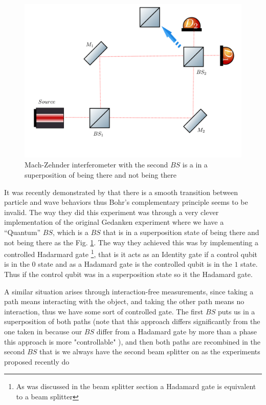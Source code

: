 \documentclass{book}
\begin{document}
\begin{figure}[H]
\centering
\includegraphics[width=\linewidth,height=7.5 cm]{images/wheeler3.png}
\caption{Mach-Zehnder interferometer with the second $BS$ is a in a superposition of being there and not being there}
\label{wheeler3}
\end{figure}

It was recently demonstrated by \cite{Peruzzo, Kaiser2012} that there is a smooth transition between particle and wave behaviors thus Bohr's complementary principle seems to be invalid. The way they did this experiment was through a very clever implementation of the original Gedanken experiment where we have a ``Quantum'' $BS$, which is a $BS$ that is in a superposition state of being there and not being there as the Fig. \ref{wheeler3}. The way they achieved this was by implementing a controlled Hadarmard gate \footnote{As was discussed in the beam splitter section a Hadamard gate is equivalent to a beam splitter}, that is it acts as an Identity gate if a control qubit is in the $0$ state and as a Hadamard gate is the controlled qubit is in the $1$ state. Thus if the control qubit was in a superposition state so it the Hadamard gate.




A similar situation arises through interaction-free measurements, since taking a path means interacting with the object, and taking the other path means no interaction, thus we have some sort of controlled gate. The first $BS$ puts us in a superposition of both paths (note that this approach differs significantly from the one taken in \cite{Peruzzo,Kaiser2012} because our $BS$ differ from a Hadamard gate by more than a phase this approach is more "controllable" ), and then both paths are recombined in the second $BS$ that is we always have the second beam splitter on as the experiments proposed recently do \cite{Polino}
\end{document}
